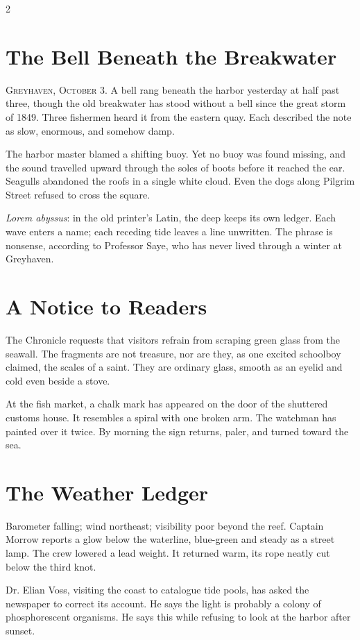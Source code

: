 \begin{multicols}{2}
\section*{The Bell Beneath the Breakwater}
\textsc{Greyhaven, October 3.} A bell rang beneath the harbor yesterday at
half past three, though the old breakwater has stood without a bell since the
great storm of 1849. Three fishermen heard it from the eastern quay. Each
described the note as slow, enormous, and somehow damp.

The harbor master blamed a shifting buoy. Yet no buoy was found missing, and
the sound travelled upward through the soles of boots before it reached the
ear. Seagulls abandoned the roofs in a single white cloud. Even the dogs along
Pilgrim Street refused to cross the square.

\textit{Lorem abyssus}: in the old printer's Latin, the deep keeps its own
ledger. Each wave enters a name; each receding tide leaves a line unwritten.
The phrase is nonsense, according to Professor Saye, who has never lived
through a winter at Greyhaven.

\section*{A Notice to Readers}
The Chronicle requests that visitors refrain from scraping green glass from
the seawall. The fragments are not treasure, nor are they, as one excited
schoolboy claimed, the scales of a saint. They are ordinary glass, smooth as
an eyelid and cold even beside a stove.

At the fish market, a chalk mark has appeared on the door of the shuttered
customs house. It resembles a spiral with one broken arm. The watchman has
painted over it twice. By morning the sign returns, paler, and turned toward
the sea.

\columnbreak
\section*{The Weather Ledger}
Barometer falling; wind northeast; visibility poor beyond the reef. Captain
Morrow reports a glow below the waterline, blue-green and steady as a street
lamp. The crew lowered a lead weight. It returned warm, its rope neatly cut
below the third knot.

Dr. Elian Voss, visiting the coast to catalogue tide pools, has asked the
newspaper to correct its account. He says the light is probably a colony of
phosphorescent organisms. He says this while refusing to look at the harbor
after sunset.


\end{multicols}
